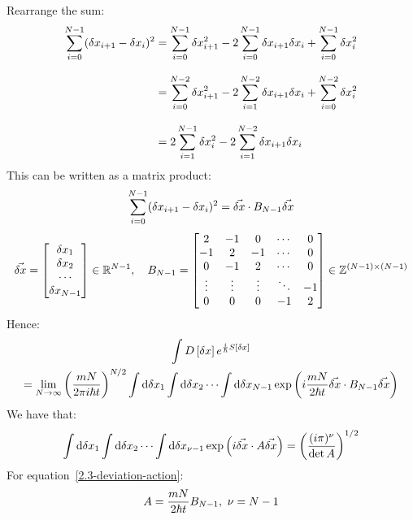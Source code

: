 Rearrange the sum:
\begin{align*}
  \sum_{i=0}^{N-1} (\delta{x}_{i+1}-\delta{x}_i)^2
   & =
  \sum_{i=0}^{N-1} \delta{x}_{i+1}^2 -
  2\sum_{i=0}^{N-1} \delta{x}_{i+1}\delta{x}_i +
  \sum_{i=0}^{N-1} \delta{x}_{i}^2
  \\[2ex]
   & =
  \sum_{i=0}^{N-2} \delta{x}_{i+1}^2 -
  2\sum_{i=1}^{N-2} \delta{x}_{i+1}\delta{x}_i +
  \sum_{i=0}^{N-2} \delta{x}_{i}^2
  \\[2ex]
   & =
  2\sum_{i=1}^{N-1} \delta{x}_{i}^2 -
  2\sum_{i=1}^{N-2} \delta{x}_{i+1}\delta{x}_i
\end{align*}
This can be written as a matrix product:
\begin{equation*}
  \sum_{i=0}^{N-1} (\delta{x}_{i+1}-\delta{x}_i)^2 = \vec{\delta{x}}\cdot B_{N-1}\vec{\delta{x}}
\end{equation*}
\begin{equation*}
  \vec{\delta{x}} =
  \begin{bmatrix}
    \delta{x}_1
    \\
    \delta{x}_2
    \\
    \cdots
    \\
    \delta{x}_{N-1}
  \end{bmatrix}
  \in \mathbb{R}^{N-1}
  ,\quad
  B_{N-1} =
  \begin{bmatrix}
    2      & - 1    & 0      & \cdots & 0
    \\
    -1     & 2      & -1     & \cdots & 0
    \\
    0      & -1     & 2      & \cdots & 0
    \\
    \vdots & \vdots & \vdots & \ddots & -1
    \\
    0      & 0      & 0      & -1     & 2
  \end{bmatrix}
  \in \mathbb{Z}^{(N-1)\times(N-1)}
\end{equation*}
Hence:
\begin{multline}
  \label{2.3-deviation-action}
  \int D\left[{\delta{x}}\right] e^{\frac{i}{\hbar} S\left[{\delta{x}}\right]}
  \\
  =
  \lim_{N \to \infty}
  \left(\frac{mN}{2\pi i\hbar t}\right)^{N/2}
  \int\text{d}\delta{x}_{1}\int\text{d}\delta{x}_{2}\cdots\int\text{d}\delta{x}_{N-1}
  \exp\left(i \frac{mN}{2\hbar t} \vec{\delta{x}}\cdot B_{N-1}\vec{\delta{x}}\right)
\end{multline}
We have that:
\begin{equation}
  \label{2.3-integral}
  \int\text{d}\delta{x}_{1}\int\text{d}\delta{x}_{2}\cdots\int\text{d}\delta{x}_{\nu-1}
  \exp\left(i\vec{\delta{x}}\cdot A\vec{\delta{x}}\right)
  =
  \left(\frac{(i\pi)^\nu}{\det A}\right)^{1/2}
\end{equation}
For equation~\ref{2.3-deviation-action}:
\begin{align*}
  A = \frac{mN}{2\hbar t} B_{N-1},\
  \nu = N-1
\end{align*}
